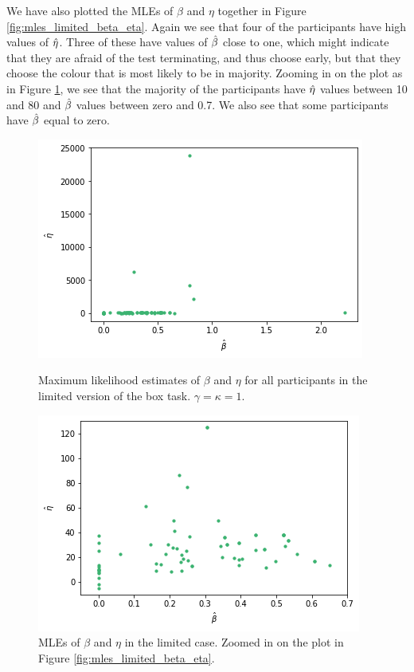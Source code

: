 We have also plotted the MLEs of $\beta$ and $\eta$ together in Figure \ref{fig:mles_limited_beta_eta}. Again we see that four of the participants have high values of $\hat{\eta}$. Three of these have values of $\hat{\beta}$ close to one, which might indicate that they are afraid of the test terminating, and thus choose early, but that they choose the colour that is most likely to be in majority. Zooming in on the plot as in Figure \ref{fig:mles_limited_beta_eta_zoomed}, we see that the majority of the participants have $\hat{\eta}$ values between 10 and 80 and $\hat{\beta}$ values between zero and 0.7. We also see that some participants have $\hat{\beta}$ equal to zero. 
\begin{figure}
    \centering
    \begin{minipage}{0.48\textwidth}
        \centering
        \includegraphics[scale=0.38]{pictures/plotted_mles_limited_beta_eta_gk1.png}
        \caption[MLEs of $\beta$ and $\eta$, limited. $\gamma=\kappa=1$]{Maximum likelihood estimates of $\beta$ and $\eta$ for all participants in the limited version of the box task. $\gamma=\kappa=1$.}
        \label{fig:mles_limited_beta_eta}
    \end{minipage}
    \hfill
    \begin{minipage}{0.48\textwidth}
        \centering
        \includegraphics[scale=0.38]{pictures/plotted_mles_limited_beta_eta_zoomed_gk1.png}
        \caption[MLEs of $\beta$ and $\eta$ zoomed, limited. $\gamma=\kappa=1$]{MLEs of $\beta$ and $\eta$ in the limited case. Zoomed in on the plot in Figure \ref{fig:mles_limited_beta_eta}.}
        \label{fig:mles_limited_beta_eta_zoomed}
    \end{minipage}
\end{figure}


